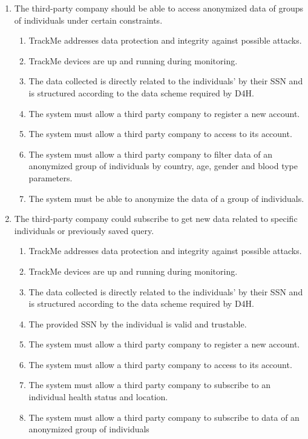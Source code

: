 \documentclass[a4paper, hidelinks, 12pt]{report}
\newcommand\requirement[1]{\item[{[R#1]}] }
\newcommand\goal[1]{\item[{[G#1]}] }
\newcommand\assumption[1]{\item[{[D#1]}] }
\begin{document}
\begin{enumerate}
		\goal{3} The third-party company should be able to access anonymized data of groups of individuals under certain constraints.
		\begin{enumerate}
			\assumption{2} TrackMe addresses data protection and integrity against possible attacks.
			\assumption{3} TrackMe devices are up and running during monitoring.
			\assumption{4} The data collected is directly related to the individuals' by their SSN and is structured according to the data scheme required by D4H.
			\requirement{5} The system must allow a third party company to register a new account.
			\requirement{6} The system must allow a third party company to access to its account.
			\requirement{9} The system must allow a third party company to filter data of an anonymized group of individuals by country, age, gender and blood type parameters.
			\requirement{10} The system must be able to anonymize the data of a group of individuals.
		\end{enumerate}
		
		\goal{4} The third-party company could subscribe to get new data related to specific individuals or previously saved query.
		\begin{enumerate}
			\assumption{2} TrackMe addresses data protection and integrity against possible attacks.
			\assumption{3} TrackMe devices are up and running during monitoring.
			\assumption{4} The data collected is directly related to the individuals' by their SSN and is structured according to the data scheme required by D4H.
			\assumption{5} The provided SSN by the individual is valid and trustable.
			\requirement{5} The system must allow a third party company to register a new account.
			\requirement{6} The system must allow a third party company to access to its account.
			\requirement{11} The system must allow a third party company to subscribe to an individual health status and location.
			\requirement{12} The system must allow a third party company to subscribe to data of an anonymized group of individuals
		\end{enumerate}
		

\end{enumerate}
\end{document}
